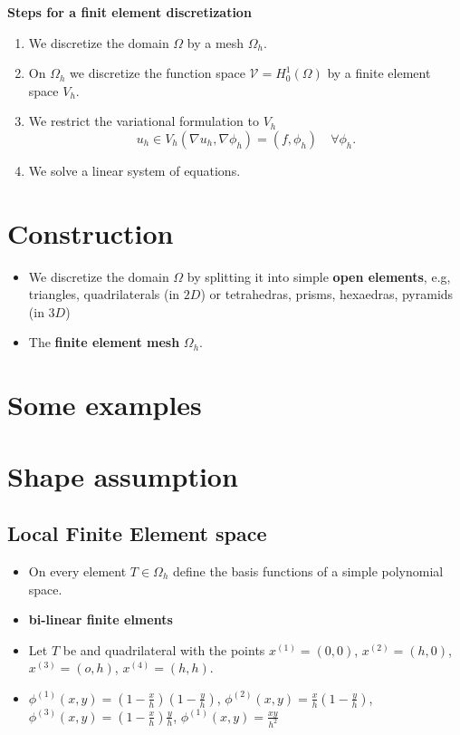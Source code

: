 \documentclass[openany,a4paper,11pt]{memoir}
\theoremstyle{definition}
\begin{document}
\textbf{Steps for a finit element discretization}

\begin{enumerate}
\item We discretize the domain $\Omega$ by a mesh $\Omega_h$.
\item On $\Omega_h$ we discretize the function space $\mathcal{V}=H^1_0(\Omega)$ by a finite element space $V_h$.
\item We restrict the variational formulation to $V_h$ \[u_h\in V_h \left(\nabla u_h,\nabla \phi_h\right)=\left(f,\phi_h\right)\quad\forall \phi_h.\]
\item We solve a linear system of equations.
\end{enumerate}

\section{Construction}

\begin{itemize}
\item We discretize the domain $\Omega$ by splitting it into simple \textbf{open elements}, e.g, triangles, quadrilaterals (in $2D$) or tetrahedras, prisms, hexaedras, pyramids (in $3D$)
\item The \textbf{finite element mesh} $\Omega_h$.
\end{itemize}

\section{Some examples}

\section{Shape assumption}

\subsection{Local Finite Element space}

\begin{itemize}
\item On every element $T\in\Omega_h$ define the basis functions of a simple polynomial space.
\item \textbf{bi-linear finite elments}
\item Let $T$ be and quadrilateral with the points $x^{(1)}=(0,0)$, $x^{(2)}=(h,0)$, $x^{(3)}=(o,h)$, $x^{(4)}=(h,h)$.
\item $\phi^{(1)}(x,y)=(1-\frac{x}{h})(1-\frac{y}{h})$, $\phi^{(2)}(x,y)=\frac{x}{h}(1-\frac{y}{h})$, $\phi^{(3)}(x,y)=(1-\frac{x}{h})\frac{y}{h}$, $\phi^{(1)}(x,y)=\frac{xy}{h^2}$
\end{itemize}
\end{document}
